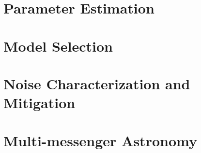 \section{Parameter Estimation}\label{sec:parameter-estimation}
\section{Model Selection}\label{sec:model-selection}
\section{Noise Characterization and Mitigation}\label{sec:noise-characterization-and-mitigation}
\section{Multi-messenger Astronomy}\label{sec:multi-messenger-astronomy}